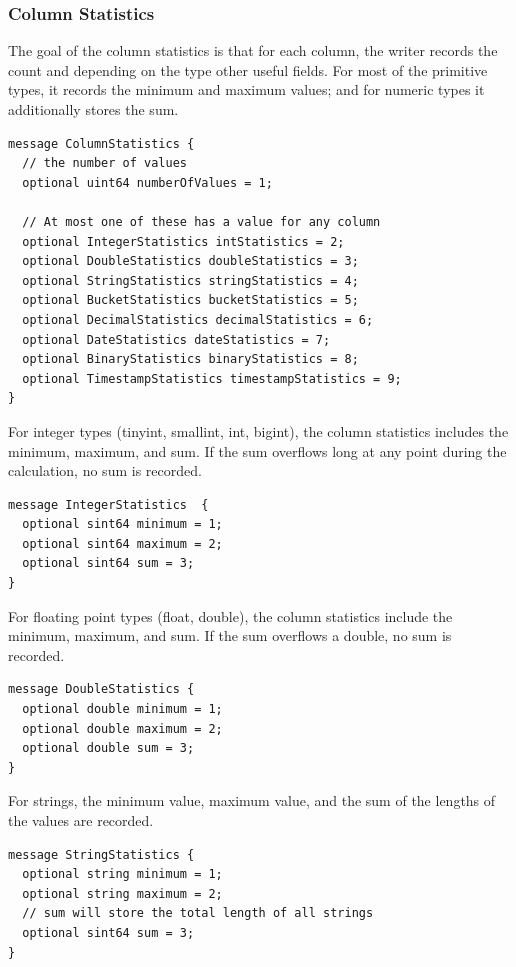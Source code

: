 \documentclass{article}
\begin{document}
\subsubsection{Column Statistics}

The goal of the column statistics is that for each column, the writer
records the count and depending on the type other useful fields.  For
most of the primitive types, it records the minimum and maximum
values; and for numeric types it additionally stores the sum.

\begin{verbatim}
message ColumnStatistics {
  // the number of values
  optional uint64 numberOfValues = 1;

  // At most one of these has a value for any column
  optional IntegerStatistics intStatistics = 2;
  optional DoubleStatistics doubleStatistics = 3;
  optional StringStatistics stringStatistics = 4;
  optional BucketStatistics bucketStatistics = 5;
  optional DecimalStatistics decimalStatistics = 6;
  optional DateStatistics dateStatistics = 7;
  optional BinaryStatistics binaryStatistics = 8;
  optional TimestampStatistics timestampStatistics = 9;
}
\end{verbatim}

For integer types (tinyint, smallint, int, bigint), the column
statistics includes the minimum, maximum, and sum. If the sum
overflows long at any point during the calculation, no sum is
recorded.

\begin{verbatim}
message IntegerStatistics  {
  optional sint64 minimum = 1;
  optional sint64 maximum = 2;
  optional sint64 sum = 3;
}
\end{verbatim}

For floating point types (float, double), the column statistics
include the minimum, maximum, and sum. If the sum overflows a double,
no sum is recorded.

\begin{verbatim}
message DoubleStatistics {
  optional double minimum = 1;
  optional double maximum = 2;
  optional double sum = 3;
}
\end{verbatim}

For strings, the minimum value, maximum value, and the sum of the
lengths of the values are recorded.

\begin{verbatim}
message StringStatistics {
  optional string minimum = 1;
  optional string maximum = 2;
  // sum will store the total length of all strings
  optional sint64 sum = 3;
}
\end{verbatim}
\end{document}
